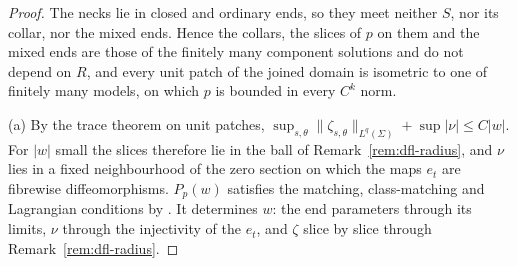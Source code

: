 \documentclass[11pt]{amsart}
\theoremstyle{definition}
\theoremstyle{remark}
\theoremstyle{plain}
\numberwithin{equation}{section}
\begin{document}
\begin{proof}
The necks lie in closed and ordinary ends, so they meet neither $S$, nor its
collar, nor the mixed ends. Hence the collars, the slices of $p$ on them and
the mixed ends are those of the finitely many component solutions and do not
depend on $R$, and every unit patch of the joined domain is isometric to one of
finitely many models, on which $p$ is bounded in every $C^k$ norm.

(a) By the trace theorem on unit patches,
$\sup_{s,\theta}\|\zeta_{s,\theta}\|_{L^q(\Sigma)}+\sup|\nu|\le C|w|$. For $|w|$
small the slices therefore lie in the ball of Remark~\ref{rem:dfl-radius}, and
$\nu$ lies in a fixed neighbourhood of the zero section on which the maps $e_t$
are fibrewise diffeomorphisms. $P_p(w)$ satisfies the matching,
class-matching and Lagrangian conditions by \cite[Lemma~4.1(iv), Lemma~4.4(iv)
and the paragraph after it]{DFL}. It determines $w$: the end parameters
through its limits, $\nu$ through the injectivity of the $e_t$, and $\zeta$
slice by slice through Remark~\ref{rem:dfl-radius}.


\end{proof}
\end{document}
